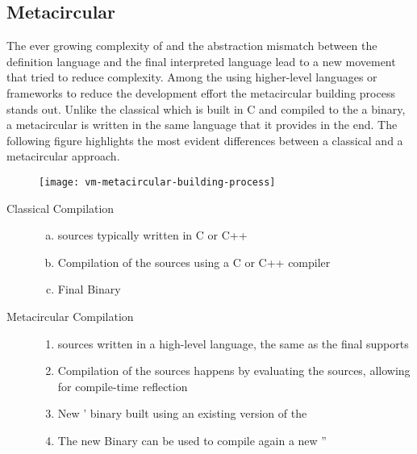 \subsection{Metacircular \VMs}
The ever growing complexity of \VMs and the abstraction mismatch between the \VM definition language and the final interpreted language lead to a new movement that tried to reduce complexity.
Among the \VMs using higher-level languages or frameworks to reduce the development effort the metacircular building process stands out.
Unlike the classical \VM which is built in C and compiled to the a binary, a metacircular \VM is written in the same language that it provides in the end.
The following figure highlights the most evident differences between a classical and a metacircular approach.
%
\begin{figure}[h]
	\centering
	\vspace{1mm}
	\texttt{[image: vm-metacircular-building-process]}
	\vspace{-10mm}
\end{figure}
%
\begin{description}
\item[Classical \VM Compilation] \hfill
	\begin{enumerate}[a), nolistsep]
		\item \VM sources typically written in C or C++
		\item Compilation of the \VM sources using a C or C++ compiler
		\item Final Binary
	\end{enumerate}

\item[Metacircular \VM Compilation] \hfill
	\begin{enumerate}[nolistsep]
		\item \VM sources written in a high-level language, the same as the final \VM supports
		\item Compilation of the \VM sources happens by evaluating the \VM sources, allowing for compile-time reflection
		\item New \VM' binary built using an existing version of the \VM
		\item The new \VM Binary can be used to compile again a new \VM''
	\end{enumerate}
\end{description}

